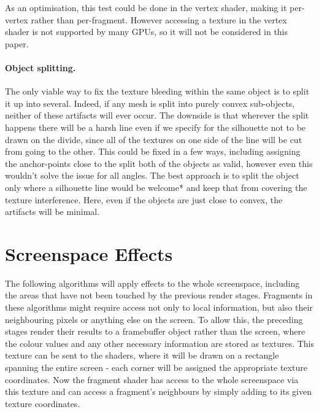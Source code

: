\documentclass[a4paper, 12pt]{article}
\begin{document}
As an optimisation, this test could be done in the vertex shader, making it per-vertex rather than per-fragment. However accessing a texture in the vertex shader is not supported by many GPUs, so it will not be considered in this paper.

\paragraph{Object splitting.}
The only viable way to fix the texture bleeding within the same object is to split it up into several. Indeed, if any mesh is split into purely convex sub-objects, neither of these artifacts will ever occur. The downside is that wherever the split happens there will be a harsh line even if we specify for the silhouette not to be drawn on the divide, since all of the textures on one side of the line will be cut from going to the other. This could be fixed in a few ways, including assigning the anchor-points close to the split both of the objects as valid, however even this wouldn't solve the issue for all angles. The best approach is to split the object only where a silhouette line would be welcome* and keep that from covering the texture interference. Here, even if the objects are just close to convex, the artifacts will be minimal.



\section{Screenspace Effects}
The following algorithms will apply effects to the whole screenspace, including the areas that have not been touched by the previous render stages. Fragments in these algorithms might require access not only to local information, but also their neighbouring pixels or anything else on the screen. To allow this, the preceding stages render their results to a framebuffer object rather than the screen, where the colour values and any other necessary information are stored as textures. This texture can be sent to the shaders, where it will be drawn on a rectangle spanning the entire screen - each corner will be assigned the appropriate texture coordinates. Now the fragment shader has access to the whole screenspace via this texture and can access a fragment's neighbours by simply adding to its given texture coordinates.
\end{document}
